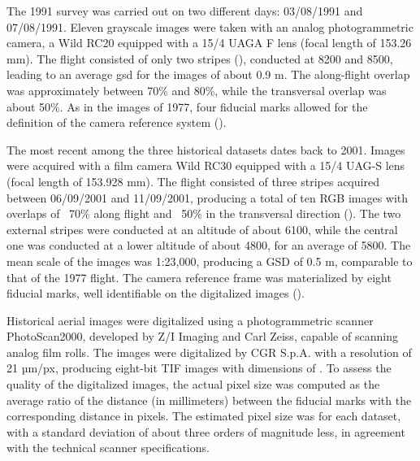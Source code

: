 The 1991 survey was carried out on two different days: 03/08/1991 and 07/08/1991.
Eleven grayscale images were taken with an analog photogrammetric camera, a Wild RC20 equipped with a 15/4 UAGA F lens (focal length of 153.26 mm). 
The flight consisted of only two stripes (), conducted at \SI{8200}{\masl} and \SI{8500}{\masl}, leading to an average \ac{gsd} for the images of about 0.9 m. The along-flight overlap was approximately between
70\% and 80\%, while the transversal overlap was about 50\%. As in the images of 1977, four fiducial marks allowed for the definition of the camera reference system ().

The most recent among the three historical datasets dates back to 2001. Images were acquired with a film camera Wild RC30 equipped with a 15/4 UAG-S lens (focal length of 153.928 mm). 
The flight consisted of three stripes acquired between 06/09/2001 and 11/09/2001, producing a total of ten RGB images with overlaps of ~70\% along flight and ~50\% in the transversal direction (). 
The two external stripes were conducted at an altitude of about \SI{6100}{\masl}, while the central one was conducted at a lower altitude of
about \SI{4800}{\masl}, for an average of \SI{5800}{\masl}. 
The mean scale of the images was 1:23,000, producing a GSD of 0.5 m, comparable to that of the 1977 flight. 
The camera reference frame was materialized by eight fiducial marks, well identifiable on the digitalized images ().

Historical aerial images were digitalized using a photogrammetric scanner PhotoScan2000, developed by Z/I Imaging and Carl Zeiss, capable of scanning analog film rolls. 
The images were digitalized by CGR S.p.A. with a resolution of 21 µm/px, producing eight-bit TIF images with dimensions of . 
To assess the quality of the digitalized images, the actual pixel size was computed as the average ratio of the distance (in millimeters) between the fiducial marks with the corresponding distance in pixels. 
The estimated pixel size was  for each dataset, with a standard deviation of about three orders of magnitude less, in agreement with the technical scanner specifications.

